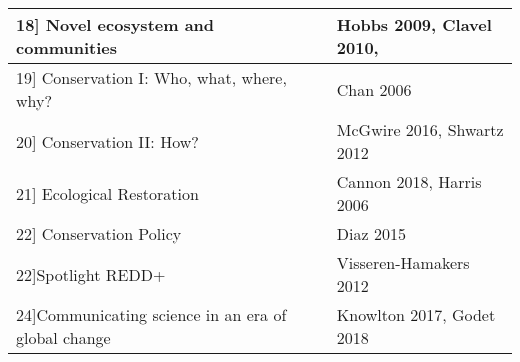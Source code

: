 \documentclass{article}\usepackage[]{graphicx}\usepackage[]{color}
\begin{document}
\begin{center}
\begin{tabular}{|l|l|}
\hline
18] Novel ecosystem and communities &  Hobbs 2009, Clavel 2010, \\
\hline
\hline
19] Conservation I: Who, what, where, why? & Chan 2006 \\
\hline
20] Conservation II: How? & McGwire 2016, Shwartz 2012 \\
\hline
21] Ecological Restoration & Cannon 2018, Harris 2006 \\
\hline
22] Conservation Policy & Diaz 2015\\
\hline
22]Spotlight REDD+  & Visseren-Hamakers 2012  \\
\hline
24]Communicating science in an era of global change & Knowlton 2017, Godet 2018 \\
\hline

\end{tabular}
\end{center}

\nocite{Anthony_2008, Clavel_2011, Cleland_2012, Cox_2000, Knoll_2007, Diaz_2008, Foley_2005, Hof_2011, IPCC_2014,Khaliq_2014,Korner_2006, Kroeker_2013, Liu_2017, Willis_2009, Schwartz_2012, McGuire_2016, Chen_2011, Knowlton_2017,Godet_2018, Bonan_2018, Vitousek_1997, Norby_2011, Plotnick_2016, Hobbs_2009, Logan_2014, Newman_2011, Diaz_2015, Chan_2006, Visseren-Hamakers_2012, Harris_2006, Cannon_2018}


\end{document}
